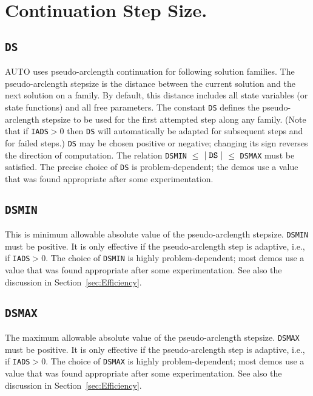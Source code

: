 \documentclass[12pt]{report}
\def\abs#1{\mid#1\mid}
\begin{document}
\section{ Continuation Step Size.} \label{sec:step_size}
\subsection{\texttt{DS}}  \label{sec:DS}
 {\cal AUTO} uses pseudo-arclength continuation for following solution families.
 The pseudo-arclength stepsize is the distance between
 the current solution and the next solution on a family.
 By default, this distance includes all state variables
 (or state functions) and all free parameters.
 The constant {\tt DS} defines the pseudo-arclength stepsize to be used for the
 first attempted step along any family. 
 (Note that if {\tt IADS}$>$0 then {\tt DS} will automatically be adapted
 for subsequent steps and for failed steps.)
 {\tt DS} may be chosen positive or negative; changing its sign 
 reverses the direction of computation.
 The relation {\tt DSMIN} $\le$ $\abs {\tt DS}$ $\le$ {\tt DSMAX} must be satisfied.
 The precise choice of {\tt DS} is problem-dependent; the demos use a value 
 that was found appropriate after some experimentation.
 

\subsection{\texttt{DSMIN}}  \label{sec:DSMIN}
 This is minimum allowable absolute value of the pseudo-arclength 
 stepsize. {\tt DSMIN} must be positive.
 It is only effective if the pseudo-arclength step is adaptive,
 i.e., if {\tt IADS}$>$0.
 The choice of {\tt DSMIN} is highly problem-dependent;
 most demos use a value that was found appropriate after some
 experimentation.
 See also the discussion in Section~\ref{sec:Efficiency}.

\subsection{\texttt{DSMAX}}  \label{sec:DSMAX}
 The maximum allowable absolute value of the pseudo-arclength stepsize.
 {\tt DSMAX} must be positive.
 It is only effective if the pseudo-arclength step is adaptive,
 i.e., if {\tt IADS}$>$0.
 The choice of {\tt DSMAX} is highly problem-dependent; 
 most demos use a value that was found appropriate after some
 experimentation.
 See also the discussion in Section~\ref{sec:Efficiency}.
\end{document}
